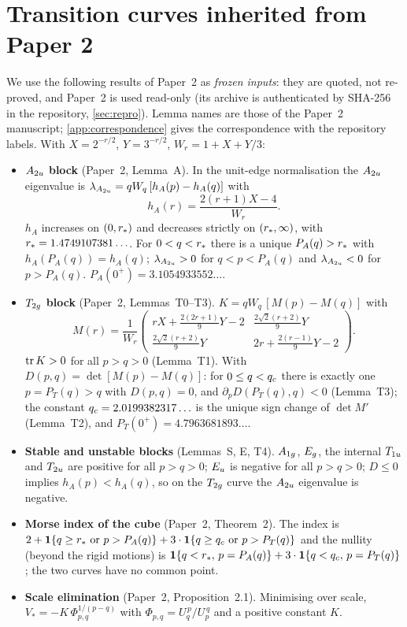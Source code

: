 \section{Transition curves inherited from Paper 2}\label{sec:curves}

We use the following results of Paper~2 \citep{Paper2} as \emph{frozen inputs}: they are quoted, not re-proved, and
Paper~2 is used read-only (its archive is authenticated by SHA-256 in the repository, \cref{sec:repro}). Lemma names
are those of the Paper~2 manuscript; \cref{app:correspondence} gives the correspondence with the repository labels. With
$X=2^{-r/2}$, $Y=3^{-r/2}$, $W_r=1+X+Y/3$:
\begin{itemize}[leftmargin=1.5em]
\item \textbf{$A_{2u}$ block} (Paper~2, Lemma~A). In the unit-edge normalisation the $A_{2u}$ eigenvalue is
$\lambda_{A_{2u}}=qW_q\,[h_A(p)-h_A(q)]$ with
\begin{equation}\label{eq:hA}
h_A(r)=\frac{2(r+1)X-4}{W_r}.
\end{equation}
$h_A$ increases on $(0,r_{*})$ and decreases strictly on $(r_{*},\infty)$, with $r_{*}=1.4749107381\ldots$. For
$0<q<r_{*}$ there is a unique $P_A(q)>r_{*}$ with $h_A(P_A(q))=h_A(q)$; $\lambda_{A_{2u}}>0$ for $q<p<P_A(q)$ and
$\lambda_{A_{2u}}<0$ for $p>P_A(q)$. $P_A(0^+)=3.1054933552\ldots$.
\item \textbf{$T_{2g}$ block} (Paper~2, Lemmas~T0--T3). $K=qW_q\,[M(p)-M(q)]$ with
\begin{equation}\label{eq:M}
M(r)=\frac{1}{W_r}\begin{pmatrix} rX+\frac{2(2r+1)}{9}Y-2 & \frac{2\sqrt2(r+2)}{9}Y\\[2pt]
\frac{2\sqrt2(r+2)}{9}Y & 2r+\frac{2(r-1)}{9}Y-2\end{pmatrix}.
\end{equation}
$\operatorname{tr} K>0$ for all $p>q>0$ (Lemma~T1). With $D(p,q)=\det[M(p)-M(q)]$: for $0\le q<q_{c}$ there is exactly one
$p=P_T(q)>q$ with $D(p,q)=0$, and $\partial_pD(P_T(q),q)<0$ (Lemma~T3); the constant $q_{c}=2.0199382317\ldots$ is the
unique sign change of $\det M'$ (Lemma~T2), and $P_T(0^+)=4.7963681893\ldots$.
\item \textbf{Stable and unstable blocks} (Lemmas~S, E, T4). $A_{1g}$, $E_{g}$, the internal $T_{1u}$ and $T_{2u}$ are
positive for all $p>q>0$; $E_{u}$ is negative for all $p>q>0$; $D\le0$ implies $h_A(p)<h_A(q)$, so on the $T_{2g}$
curve the $A_{2u}$ eigenvalue is negative.
\item \textbf{Morse index of the cube} (Paper~2, Theorem~2). The index is
$2+\mathbf{1}\{q\ge r_{*}\text{ or }p>P_A(q)\}+3\cdot\mathbf{1}\{q\ge q_{c}\text{ or }p>P_T(q)\}$ and the nullity (beyond the rigid
motions) is $\mathbf{1}\{q<r_{*},\,p=P_A(q)\}+3\cdot\mathbf{1}\{q<q_{c},\,p=P_T(q)\}$; the two curves have no common point.
\item \textbf{Scale elimination} (Paper~2, Proposition~2.1). Minimising over scale, $V_*=-K\,\Phi_{p,q}^{1/(p-q)}$
with $\Phi_{p,q}=U_q^{\,p}/U_p^{\,q}$ and a positive constant $K$.
\end{itemize}

